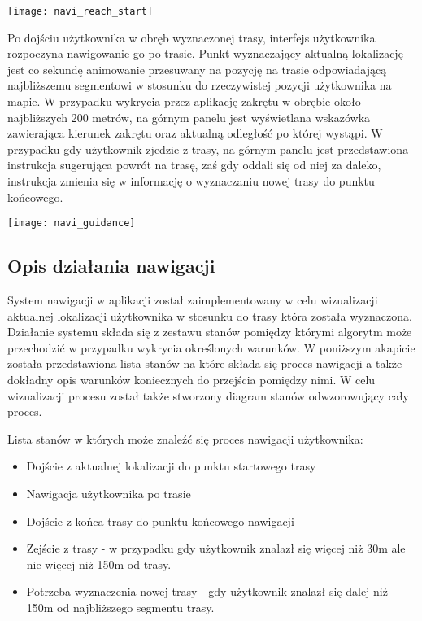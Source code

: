 \begin{center}
\texttt{[image: navi\_reach\_start]}
\end{center}

Po dojściu użytkownika w obręb wyznaczonej trasy, interfejs użytkownika rozpoczyna nawigowanie go po trasie. Punkt wyznaczający aktualną lokalizację jest co sekundę animowanie przesuwany na pozycję na trasie odpowiadającą najbliższemu segmentowi w stosunku do rzeczywistej pozycji użytkownika na mapie. W przypadku wykrycia przez aplikację zakrętu w obrębie około najbliższych 200 metrów, na górnym panelu jest wyświetlana wskazówka zawierająca kierunek zakrętu oraz aktualną odległość po której wystąpi. W przypadku gdy użytkownik zjedzie z trasy, na górnym panelu jest przedstawiona instrukcja sugerująca powrót na trasę, zaś gdy oddali się od niej za daleko, instrukcja zmienia się w informację o wyznaczaniu nowej trasy do punktu końcowego.

\begin{center}
\texttt{[image: navi\_guidance]}
\end{center}

\subsection{Opis działania nawigacji}

System nawigacji w aplikacji został zaimplementowany w celu wizualizacji aktualnej lokalizacji użytkownika w stosunku do trasy która została wyznaczona. Działanie systemu składa się z zestawu stanów pomiędzy którymi algorytm może przechodzić w przypadku wykrycia określonych warunków. W poniższym akapicie została przedstawiona lista stanów na które składa się proces nawigacji a także dokładny opis warunków koniecznych do przejścia pomiędzy nimi. W celu wizualizacji procesu został także stworzony diagram stanów odwzorowujący cały proces.

Lista stanów w których może znaleźć się proces nawigacji użytkownika:

\begin{itemize}
\item Dojście z aktualnej lokalizacji do punktu startowego trasy
\item Nawigacja użytkownika po trasie
\item Dojście z końca trasy do punktu końcowego nawigacji
\item Zejście z trasy - w przypadku gdy użytkownik znalazł się więcej niż 30m ale nie więcej niż 150m od trasy.
\item Potrzeba wyznaczenia nowej trasy - gdy użytkownik znalazł się dalej niż 150m od najbliższego segmentu trasy.
\end{itemize}

